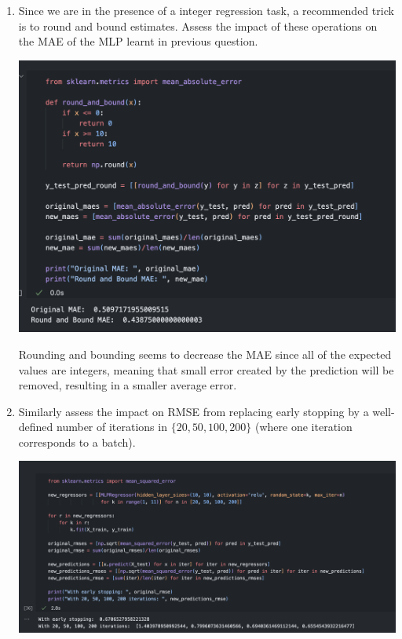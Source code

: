 \documentclass[12pt]{article}
\begin{document}
\begin{enumerate}
    \item Since we are in the presence of a integer regression task, a recommended trick is to
    round and bound estimates. Assess the impact of these operations on the MAE of the MLP
    learnt in previous question.

    \begin{center}
        \includegraphics[scale=0.6]{images/code8.png}
    \end{center}

    Rounding and bounding seems to decrease the MAE since all of the expected values are integers, meaning that small error created by the prediction will be removed, resulting in a smaller average error.

    \item Similarly assess the impact on RMSE from replacing early stopping by a well-defined
    number of iterations in $\{20,50,100,200\}$ (where one iteration corresponds to a batch).

    \begin{center}
        \includegraphics[scale=0.4]{images/code9.png}
    \end{center}


\end{enumerate}
\end{document}
